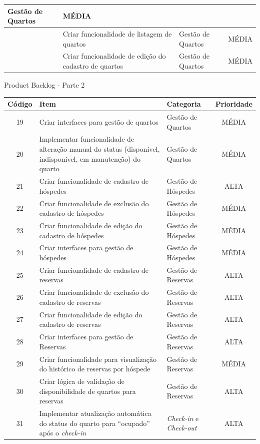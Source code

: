 \documentclass[
	12pt,				%
	openany,			%
	oneside,			%
	a4paper,			%
	english,			%
	french,				%
	spanish,			%
	brazil				%
	]{abntex2}
\begin{document}
\begin{apendicesenv}
\begin{quadro}[H]
\begin{tabular}{|>{\centering\arraybackslash}m{1.4cm}|>{\raggedright\arraybackslash}m{6.5cm}|>{\raggedright\arraybackslash}m{3.8cm}|>{\raggedright\arraybackslash}m{2.5cm}|}
		Gestão de Quartos & MÉDIA \\ \hline
		17 & Criar funcionalidade de listagem de quartos & Gestão de Quartos & MÉDIA \\ \hline
		18 & Criar funcionalidade de edição do cadastro de quartos &
		Gestão de Quartos &	MÉDIA \\ \hline
	\end{tabular}
\end{quadro}
%
\begin{quadro}[H]
	\caption{Product Backlog - Parte 2}
	\label{quadro:product_backlog_2}
	\begin{tabular}{|c|p{6.5cm}|p{3.8cm}|c|}
		\hline
		\textbf{Código} & \textbf{Item} & \textbf{Categoria} & \textbf{Prioridade} \\	\hline	
		19 & Criar interfaces para gestão de quartos & Gestão de Quartos & MÉDIA \\ \hline
		20 & Implementar funcionalidade de alteração manual do status (disponível, indisponível, em manutenção) do quarto & Gestão de Quartos & MÉDIA \\ \hline
		21 & Criar funcionalidade de cadastro de hóspedes &	Gestão de Hóspedes & ALTA \\ \hline
		22 & Criar funcionalidade de exclusão do cadastro de hóspedes &
		Gestão de Hóspedes & MÉDIA \\ \hline
		23 & Criar funcionalidade de edição do cadastro de hóspedes &
		Gestão de Hóspedes & MÉDIA \\ \hline
		24 & Criar interfaces para gestão de hóspedes &	Gestão de Hóspedes & MÉDIA \\ \hline
		25 & Criar funcionalidade de cadastro de reservas &	Gestão de Reservas & ALTA \\ \hline
		26 & Criar funcionalidade de exclusão do cadastro de reservas &
		Gestão de Reservas & ALTA \\ \hline
		27 & Criar funcionalidade de edição do cadastro de reservas &
		Gestão de Reservas & ALTA \\ \hline
		28 & Criar interfaces para gestão de Reservas &	Gestão de Reservas & ALTA \\ \hline
		29 & Criar funcionalidade para visualização do histórico de reservas por hóspede & Gestão de Reservas &	MÉDIA \\ \hline
		30 & Criar lógica de validação de disponibilidade de quartos para reservas & Gestão de Reservas & ALTA \\ \hline
		31 & Implementar atualização automática do status do quarto para “ocupado” após o \textit {check-in} & \textit {Check-in} e \textit {Check-out} & ALTA 

\end{tabular}
\end{quadro}
\end{apendicesenv}
\end{document}
